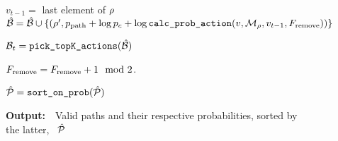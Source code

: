 \begin{figure}
\begin{minipage}{1.\textwidth}
\begin{algorithm}[H]
\begin{algorithmic}[1]
				\STATE $v_{t-1} = $ last element of $\rho$
				\STATE $\hat{{\mathcal{B}}} = \hat{{\mathcal{B}}} \cup \{(\rho' , p_{\textrm{path}} + \log p_c + \log \texttt{calc\_prob\_action}(v, {\mathcal{M}}_\rho, v_{t-1}, F_\textrm{remove}) )\}$
			\ENDFOR
		\ENDFOR
		
		\STATE  ${\mathcal{B}}_{t} = \texttt{pick\_topK\_actions}(\hat{{\mathcal{B}}})$ 
		
		\STATE $F_\textrm{remove} = F_\textrm{remove} + 1 \mod 2$. 
	\ENDFOR
	
  \STATE
  \STATE $\hat{{\mathcal{P}}} = \texttt{sort\_on\_prob}(\hat{{\mathcal{P}}})$
  \end{algorithmic}
  {\bf Output:}~~Valid paths and their respective probabilities, sorted by the latter, ~$\hat{{\mathcal{P}}}$
  \label{algo:valid_path}
\end{algorithm}
\end{minipage}
\end{figure}